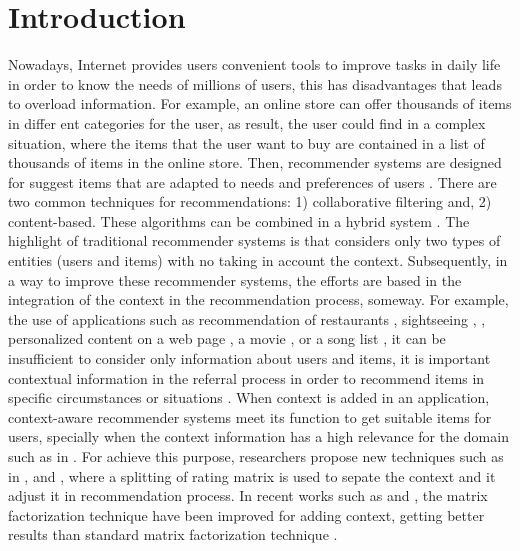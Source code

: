 \section{Introduction} \label{intro} 

Nowadays, Internet provides users convenient tools to improve tasks in daily
life in order to know the needs of millions of users, this has disadvantages
that leads to overload information. For example, an online store can offer
thousands of items in differ  ent categories for the user, as result, the user
could find in a complex situation, where the items that the user want to buy are
contained in a list of thousands of items in the online store. Then, recommender
systems are designed for suggest items that are adapted to needs and preferences
of users \cite{ricci2011introduction}. There are two common  techniques for
recommendations: 1) collaborative filtering and, 2) content-based. These
algorithms can be combined in a hybrid system \cite{burke2007hybrid}.   The
highlight of traditional recommender systems is that considers only two types of
entities (users and items) with no taking in account the context. Subsequently,
in a way to improve these recommender systems, the efforts are based in the
integration of the context in the recommendation process, someway. For example,
the use of applications such as recommendation of restaurants
\cite{ramirez2014post}, sightseeing \cite{baltrunas2011},
\cite{baltrunas2011context}, personalized content on a web page
\cite{marina2010ontology}, a movie \cite{kim2010recommender}, or a song list
\cite{baltrunas2011incarmusic}, it can be insufficient to consider only
information about users and items, it is important contextual information in the
referral process in order to recommend items in specific circumstances or
situations \cite{zimmermann2000personalization}.  When context is added in an
application, context-aware recommender systems meet its  function to get
suitable items for users, specially when the context information has a high
relevance for the domain such as in \cite{baltrunas2011context}.  For achieve
this purpose, researchers propose new techniques such as in
\cite{said2011inferring},\cite{zheng2014splitting} and
\cite{baltrunas2009context2} , where a splitting of rating matrix is used to
sepate the context and it adjust it in recommendation process.   In recent works
such as \cite{zhengcorrelation} and \cite{baltrunas2011matrix} , the matrix
factorization technique have been improved for adding context, getting better
results than standard matrix factorization technique \cite{koren2009matrix}.
